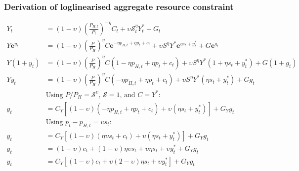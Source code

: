 \subsubsection*{Derivation of loglinearised aggregate resource constraint}
\begin{align}\label{eq:appendix_log_rc_beginning}
    Y_t &= (1-\upsilon)\left(\frac{P_{H,t}}{P_t}\right)^{-\eta}C_t + \upsilon \mathcal{S}_t^{\eta}Y_t^* + G_t\\
    Y \mathbf{e}^{y_t} &= (1-\upsilon)\left(\frac{P}{P_{H}}\right)^{\eta}C \mathbf{e}^{-\eta p_{H,t} + \eta p_t + c_t}+ \upsilon S^{\eta} Y^* \mathbf{e}^{\eta s_t + y^*_t} + G \mathbf{e}^{g_t}\\
    Y ({1+y_t}) &= (1-\upsilon)\left(\frac{P}{P_{H}}\right)^{\eta}C ({1 -\eta p_{H,t} + \eta p_t + c_t})+ \upsilon S^{\eta} Y^* ({1 + \eta s_t + y^*_t}) + G ({1+ g_t})\\
    Y y_t &= (1-\upsilon)\left(\frac{P}{P_{H}}\right)^{\eta}C ({-\eta p_{H,t} + \eta p_t + c_t})+ \upsilon S^{\eta} Y^* ({\eta s_t + y^*_t}) + G g_t\\
    &\text{Using $P/P_H = \mathcal{S}^\upsilon$, $\mathcal{S} = 1$, and $C=Y^*$}:\nonumber\\
    y_t &= C_Y\left[(1-\upsilon)({-\eta p_{H,t} + \eta p_t + c_t})+ \upsilon ({\eta s_t + y^*_t})\right] + G_Y g_t\\
    &\text{Using $p_t - p_{H,t} = \upsilon s_t$}:\nonumber\\
    y_t &= C_Y\left[(1-\upsilon)({\eta \upsilon s_t + c_t})+ \upsilon ({\eta s_t + y^*_t})\right] + G_Y g_t\\
    y_t &= (1-\upsilon)c_t + (1-\upsilon) \eta \upsilon s_t + \upsilon {\eta s_t} + \upsilon y^*_t + G_Y g_t\\
    y_t &= C_Y\left[(1-\upsilon)c_t + \upsilon (2-\upsilon)\eta s_t + \upsilon y^*_t\right] + G_Y g_t \label{eq:appendix_log_rc_end}
\end{align}
\newpage
